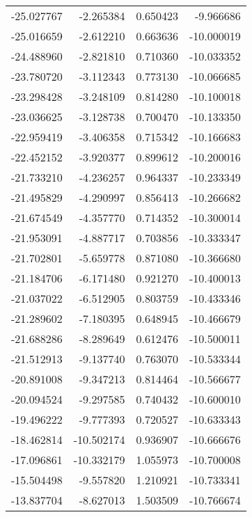 \begin{tabular}{rrrr}
      -25.027767 &        -2.265384 &    0.650423 &  -9.966686 \\
      -25.016659 &        -2.612210 &    0.663636 & -10.000019 \\
      -24.488960 &        -2.821810 &    0.710360 & -10.033352 \\
      -23.780720 &        -3.112343 &    0.773130 & -10.066685 \\
      -23.298428 &        -3.248109 &    0.814280 & -10.100018 \\
      -23.036625 &        -3.128738 &    0.700470 & -10.133350 \\
      -22.959419 &        -3.406358 &    0.715342 & -10.166683 \\
      -22.452152 &        -3.920377 &    0.899612 & -10.200016 \\
      -21.733210 &        -4.236257 &    0.964337 & -10.233349 \\
      -21.495829 &        -4.290997 &    0.856413 & -10.266682 \\
      -21.674549 &        -4.357770 &    0.714352 & -10.300014 \\
      -21.953091 &        -4.887717 &    0.703856 & -10.333347 \\
      -21.702801 &        -5.659778 &    0.871080 & -10.366680 \\
      -21.184706 &        -6.171480 &    0.921270 & -10.400013 \\
      -21.037022 &        -6.512905 &    0.803759 & -10.433346 \\
      -21.289602 &        -7.180395 &    0.648945 & -10.466679 \\
      -21.688286 &        -8.289649 &    0.612476 & -10.500011 \\
      -21.512913 &        -9.137740 &    0.763070 & -10.533344 \\
      -20.891008 &        -9.347213 &    0.814464 & -10.566677 \\
      -20.094524 &        -9.297585 &    0.740432 & -10.600010 \\
      -19.496222 &        -9.777393 &    0.720527 & -10.633343 \\
      -18.462814 &       -10.502174 &    0.936907 & -10.666676 \\
      -17.096861 &       -10.332179 &    1.055973 & -10.700008 \\
      -15.504498 &        -9.557820 &    1.210921 & -10.733341 \\
      -13.837704 &        -8.627013 &    1.503509 & -10.766674 \\

\end{tabular}
